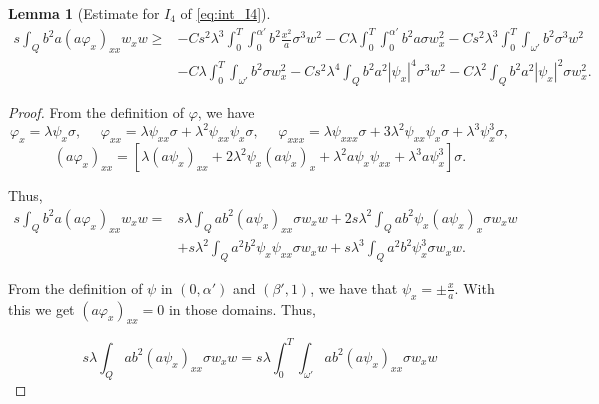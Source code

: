 \documentclass[11pt,oneside,a4papper]{osajnl}
\newtheorem{lema}{Lemma}
\begin{document}
\begin{lema}[Estimate for $I_4$ of \eqref{eq:int_I4}]
\label{lemaA8}
	\begin{equation*}
    \begin{split}
		s \int_Q b^2 a (a \varphi_x)_{xx} w_x w \geq
		&- C s^2\lambda^3 \int_0^T \int_0^{\alpha'} b^2 \frac{x^2}{a}  \sigma^3 w^2 - C \lambda \int_0^T \int_0^{\alpha'} b^2 a \sigma w_x^2
		- Cs^2\lambda^3 \int_0^T\int_{\omega'} b^2 \sigma^3 w^2 \\
		&- C\lambda \int_0^T\int_{\omega'} b^2 \sigma w_x^2
		-Cs^2\lambda^4 \int_Q b^2 a^2 |\psi_x|^4 \sigma^3 w^2 - C\lambda^2 \int_Q b^2 a^2|\psi_x|^2\sigma w_x^2.
    \end{split}
	\end{equation*}
\end{lema}
\begin{proof}
    From the definition of $\varphi$, we have
    $$\varphi_x=\lambda \psi_x \sigma, \ \ \ \ \ \ \varphi_{xx}=\lambda \psi_{xx}\sigma +\lambda^2\psi_{xx}\psi_x \sigma, \ \ \ \ \ \ \varphi_{xxx}=\lambda \psi_{xxx}\sigma +3\lambda^2 \psi_{xx}\psi_x \sigma+\lambda^3\psi_x^3\sigma,$$
    $$ (a\varphi_x)_{xx}=\left[ \lambda (a\psi_x)_{xx}+2\lambda^2 \psi_x (a\psi_x)_x+\lambda^2a\psi_x\psi_{xx}+\lambda^3 a\psi_x^3   \right]\sigma.$$
    
    Thus, 
	\begin{align*}
		s\int_Q b^2 a (a \varphi_x)_{xx} w_x w=&s\lambda\int_Q ab^2 (a\psi_x)_{xx} \sigma w_x w+2s\lambda^2 \int_Q ab^2 \psi_x (a\psi_x)_x \sigma w_x w\\
		&+s\lambda^2\int_Q a^2b^2\psi_x\psi_{xx} \sigma w_x w
		+s\lambda^3\int_Q a^2b^2\psi_x^3 \sigma w_x w.
	\end{align*}
    
	From the definition of $\psi$ in $(0,\alpha')$ and $(\beta',1)$, we have that $\psi_x=\pm\frac{x}{a}$. With this we get $(a \varphi_x)_{xx}=0$  in those domains. Thus,
		
	$$s\lambda\int_Q ab^2 (a\psi_x)_{xx} \sigma w_x w=s\lambda\int_0^T\int_{\omega'} ab^2 (a\psi_x)_{xx} \sigma w_x w $$


\end{proof}
\end{document}

